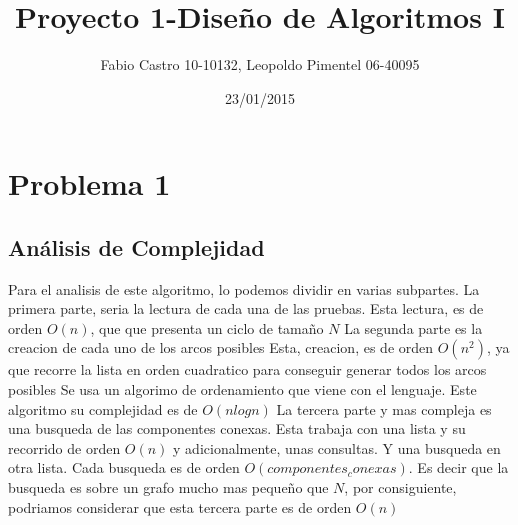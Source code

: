 \documentclass[a4paper,10pt]{article}
\title{}
\author{}
\date{}
\begin{document}
 
\title{\Huge Proyecto 1-Diseño de Algoritmos I}



\author{Fabio Castro 10-10132, Leopoldo Pimentel 06-40095} 



\date{23/01/2015}

\maketitle
\section{Problema 1}
\subsection{Análisis de Complejidad}
  \hspace{2cm}Para el analisis de este algoritmo, lo podemos dividir  en varias subpartes.
  La primera parte, seria la lectura de cada una de las pruebas.
  Esta lectura, es de orden {$O(n)$}, que que presenta un ciclo de tamaño {$N$}
  La segunda parte es la creacion de cada uno de los arcos posibles
  Esta, creacion, es de orden {$O(n^2)$}, ya que recorre la lista 
  en orden cuadratico para conseguir generar todos los arcos posibles
  Se usa un algorimo de ordenamiento que viene con el lenguaje. Este algoritmo su complejidad es de {$O(nlogn)$}
  La tercera parte y mas compleja es una busqueda de las componentes conexas.
  Esta trabaja con una lista y su recorrido de orden {$O(n)$}
  y adicionalmente, unas consultas. Y una busqueda en otra lista.
  Cada busqueda es de orden {$O(componentes_conexas)$}. Es decir que la busqueda es sobre un 
  grafo mucho mas pequeño que {$N$}, por consiguiente, podriamos considerar que esta tercera 
  parte es de orden {$O(n)$}
\end{document}
